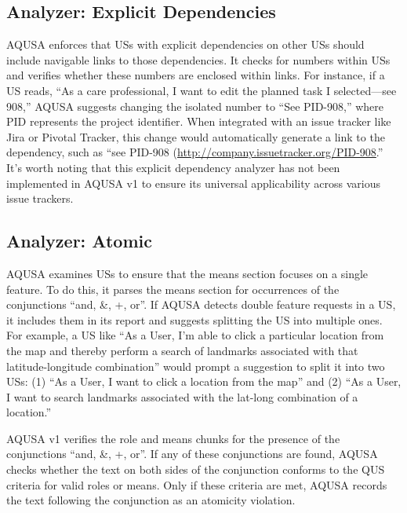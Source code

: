 \subsection*{\normalsize{Analyzer: Explicit Dependencies}}
AQUSA enforces that USs with explicit dependencies on other USs should include navigable links to those dependencies. It checks for numbers within USs and verifies whether these numbers are enclosed within links. For instance, if a US reads, \enquote{As a care professional, I want to edit the planned task I selected—see 908,} AQUSA suggests changing the isolated number to \enquote{See PID-908,} where PID represents the project identifier. When integrated with an issue tracker like Jira or Pivotal Tracker, this change would automatically generate a link to the dependency, such as \enquote{see PID-908 (\href{http://company.issuetracker.org/PID-908)}{http://company.issuetracker.org/PID-908}.} It's worth noting that this explicit dependency analyzer has not been implemented in AQUSA v1 to ensure its universal applicability across various issue trackers.
\subsection*{\normalsize{Analyzer: Atomic}}
AQUSA examines USs to ensure that the means section focuses on a single feature. To do this, it parses the means section for occurrences of the conjunctions \enquote{and, \&, +, or}. If AQUSA detects double feature requests in a US, it includes them in its report and suggests splitting the US into multiple ones. 
For example, a US like \enquote{As a User, I’m able to click a particular location from the map and thereby perform a search of landmarks associated with that latitude-longitude combination} would prompt a suggestion to split it into two USs: (1) \enquote{As a User, I want to click a location from the map} and (2) \enquote{As a User, I want to search landmarks associated with the lat-long combination of a location.}

AQUSA v1 verifies the role and means chunks for the presence of the conjunctions \enquote{and, \&, +, or}. If any of these conjunctions are found, AQUSA checks whether the text on both sides of the conjunction conforms to the QUS criteria for valid roles or means. Only if these criteria are met, AQUSA records the text following the conjunction as an atomicity violation. 
